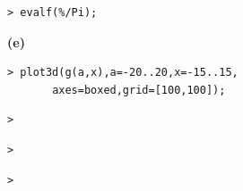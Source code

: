 \documentclass{article}
\begin{document}
\begin{lstlisting}
> evalf(%/Pi);
\end{lstlisting}
\begin{Maple Heading 2}
\textbf{(e)}
\end{Maple Heading 2}
\begin{lstlisting}
> plot3d(g(a,x),a=-20..20,x=-15..15,
       axes=boxed,grid=[100,100]);
\end{lstlisting}
\begin{lstlisting}
> 
\end{lstlisting}
\begin{lstlisting}
> 
\end{lstlisting}
\begin{lstlisting}
> 
\end{lstlisting}
\end{document}
